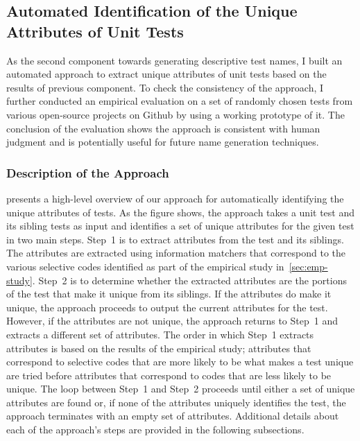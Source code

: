 \subsection{Automated Identification of the Unique Attributes of Unit Tests}
\label{sec:uniquness-approach}

As the second component towards generating descriptive test names, I built an automated approach to extract unique attributes of unit tests based on the results of previous component.
%
To check the consistency of the approach, I further conducted an empirical evaluation on a set of randomly chosen tests from various open-source projects on Github by using a working prototype of it.
%
The conclusion of the evaluation shows the approach is consistent with human judgment and is potentially useful for future name generation techniques.


\subsubsection{Description of the Approach}

 presents a high-level overview of our approach for automatically identifying the unique attributes of tests.
%
As the figure shows, the approach takes a unit test and its sibling tests as input and identifies a set of unique attributes for the given test in two main steps.
%
Step~1 is to extract attributes from the test and its siblings.
%
The attributes are extracted using information matchers that correspond to the various selective codes identified as part of the empirical study in~\cref{sec:emp-study}.
%
Step~2 is to determine whether the extracted attributes are the portions of the test that make it unique from its siblings.
%
If the attributes do make it unique, the approach proceeds to output the current attributes for the test.
%
However, if the attributes are not unique, the approach returns to Step~1 and extracts a different set of attributes.
%
The order in which Step~1 extracts attributes is based on the results of the empirical study; attributes that correspond to selective codes that are more likely to be what makes a test unique are tried before attributes that correspond to codes that are less likely to be unique.
% 
The loop between Step~1 and Step~2 proceeds until either a set of unique attributes are found or, if none of the attributes uniquely identifies the test, the approach terminates with an empty set of attributes.
%
Additional details about each of the approach's steps are provided in the following subsections.


